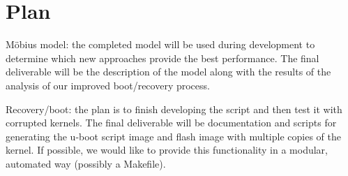 \section{Plan}

M\"obius model: the completed model will be used during development to determine which new approaches provide the best performance.  The final deliverable will be the description of the model along with the results of the analysis of our improved boot/recovery process.

Recovery/boot: the plan is to finish developing the script and then test it with
corrupted kernels.  The final deliverable will be documentation and scripts for
generating the u-boot script image and flash image with multiple copies of the
kernel.  If possible, we would like to provide this functionality in a modular,
automated way (possibly a Makefile).
